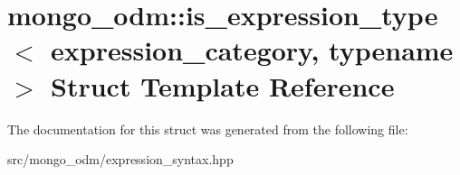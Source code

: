 \hypertarget{structmongo__odm_1_1is__expression__type}{}\section{mongo\+\_\+odm\+:\+:is\+\_\+expression\+\_\+type$<$ expression\+\_\+category, typename $>$ Struct Template Reference}
\label{structmongo__odm_1_1is__expression__type}


The documentation for this struct was generated from the following file\+:\begin{DoxyCompactItemize}
\item 
src/mongo\+\_\+odm/expression\+\_\+syntax.\+hpp\end{DoxyCompactItemize}
